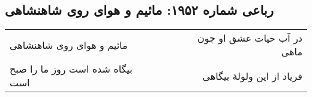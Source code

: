 \begin{center}
\section*{رباعی شماره ۱۹۵۲: مائیم و هوای روی شاهنشاهی}
\label{sec:1952}
\begin{longtable}{l p{0.5cm} r}
مائیم و هوای روی شاهنشاهی
&&
در آب حیات عشق او چون ماهی
\\
بیگاه شده است روز ما را صبح است
&&
فریاد از این ولولهٔ بیگاهی
\\
\end{longtable}
\end{center}

